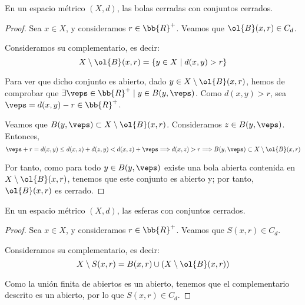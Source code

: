 \begin{prop}
    En un espacio métrico $(X,d)$, las bolas cerradas con conjuntos cerrados.
\end{prop}
\begin{proof}
    Sea $x\in X$, y consideramos $r\in \bb{R}^+$. Veamos que $\ol{B}(x,r)\in C_d$.

    Consideramos su complementario, es decir:
    \begin{equation*}
        X\setminus \ol{B}(x,r) = \{y\in X\mid d(x,y)>r\}
    \end{equation*}

    Para ver que dicho conjunto es abierto, dado $y\in X\setminus \ol{B}(x,r)$, hemos de comprobar que $\exists \veps\in \bb{R}^+\mid y\in B(y,\veps)$. Como $d(x,y)>r$, sea $\veps=d(x,y)-r\in \bb{R}^+$. 
    
    Veamos que $B(y,\veps)\subset X\setminus \ol{B}(x,r)$. Consideramos $z\in B(y,\veps)$. Entonces,
    \begin{equation*}
        \veps+r = d(x,y)\leq d(x,z)+d(z,y) < d(x,z)+\veps \Longrightarrow d(x,z)>r \Longrightarrow B(y,\veps)\subset X\setminus \ol{B}(x,r)
    \end{equation*}
    
    
    Por tanto, como para todo $y\in B(y,\veps)$ existe una bola abierta contenida en $X\setminus \ol{B}(x,r)$, tenemos que este conjunto es abierto y; por tanto, $\ol{B}(x,r)$ es cerrado.
\end{proof}

\begin{coro}
    En un espacio métrico $(X,d)$, las esferas con conjuntos cerrados.
\end{coro}
\begin{proof}
    Sea $x\in X$, y consideramos $r\in \bb{R}^+$. Veamos que $S(x,r)\in C_d$.

    Consideramos su complementario, es decir:
    \begin{equation*}
        X\setminus S(x,r) = B(x,r)\cup \left(X\setminus \ol{B}(x,r)\right)
    \end{equation*}

    Como la unión finita de abiertos es un abierto, tenemos que el complementario descrito es un abierto, por lo que $S(x,r)\in C_d$.
\end{proof}


